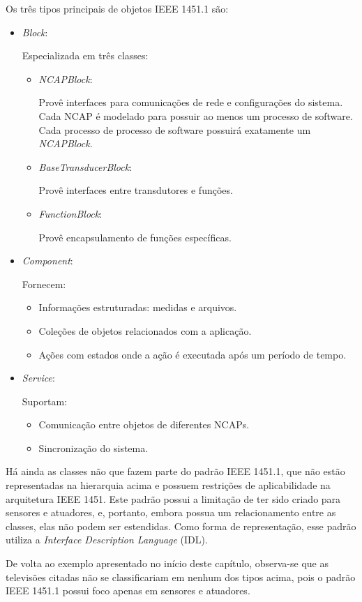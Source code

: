 Os três tipos principais de objetos IEEE 1451.1 são:

\begin{itemize}
	\item\emph{Block}:

	Especializada em três classes:
		\begin{itemize}
			\item\emph{NCAPBlock}:

				Provê interfaces para comunicações de rede e configurações do sistema. Cada NCAP é modelado para possuir ao menos um processo de software. Cada processo de processo de software possuirá exatamente um \emph{NCAPBlock}.
			\item\emph{BaseTransducerBlock}:

				Provê interfaces entre transdutores e funções.
			\item\emph{FunctionBlock}:

				Provê encapsulamento de funções específicas.
		\end{itemize}
	
	\item\emph{Component}:
	
		Fornecem:
		\begin{itemize}
			\item Informações estruturadas: medidas e arquivos.
			\item Coleções de objetos relacionados com a aplicação.
			\item Ações com estados onde a ação é executada após um período de tempo.
		\end{itemize}
	\item\emph{Service}:
	
		Suportam:
		\begin{itemize}
			\item Comunicação entre objetos de diferentes NCAPs.
			\item Sincronização do sistema.
		\end{itemize}
\end{itemize}

Há ainda as classes não que fazem parte do padrão IEEE 1451.1, que não estão representadas na hierarquia acima e possuem restrições de aplicabilidade na arquitetura IEEE 1451. Este padrão possui a limitação de ter sido criado para sensores e atuadores, e, portanto, embora possua um relacionamento entre as classes, elas não podem ser estendidas. Como forma de representação, esse padrão utiliza a \emph{Interface Description Language} (IDL).

De volta ao exemplo apresentado no início deste capítulo, observa-se que as televisões citadas não se classificariam em nenhum dos tipos acima, pois o padrão IEEE 1451.1 possui foco apenas em sensores e atuadores.
